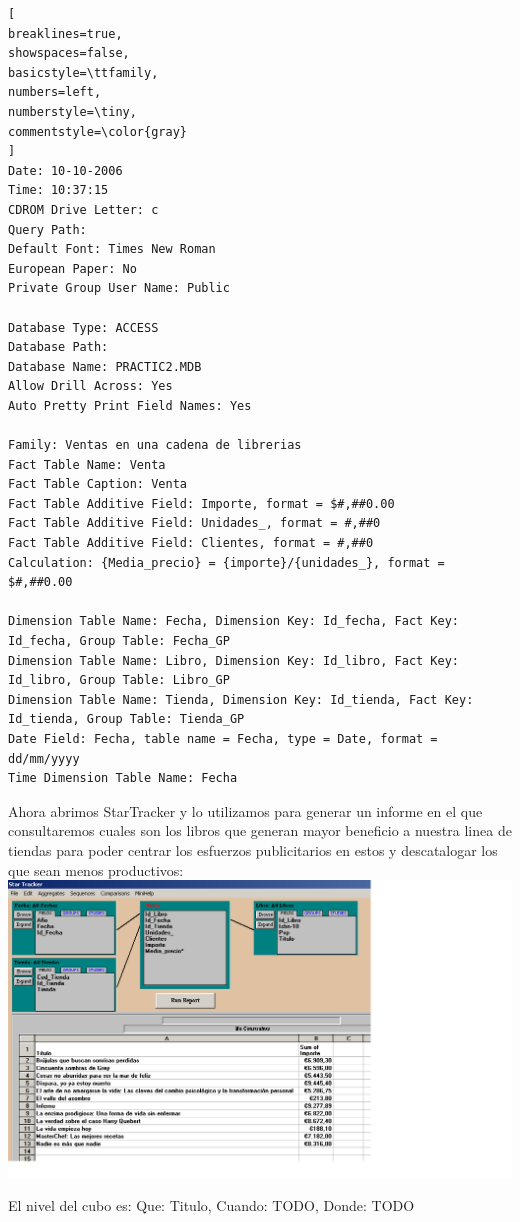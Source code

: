 \documentclass[paper=a4, fontsize=11pt, spanish]{scrartcl}
\numberwithin{equation}{section} %
\numberwithin{figure}{section} %
\numberwithin{table}{section} %
\begin{document}
\begin{lstlisting}[
breaklines=true,
showspaces=false,
basicstyle=\ttfamily,
numbers=left,
numberstyle=\tiny,
commentstyle=\color{gray}
]
Date: 10-10-2006
Time: 10:37:15
CDROM Drive Letter: c
Query Path:
Default Font: Times New Roman
European Paper: No
Private Group User Name: Public

Database Type: ACCESS
Database Path: 
Database Name: PRACTIC2.MDB
Allow Drill Across: Yes
Auto Pretty Print Field Names: Yes

Family: Ventas en una cadena de librerias
Fact Table Name: Venta
Fact Table Caption: Venta
Fact Table Additive Field: Importe, format = $#,##0.00
Fact Table Additive Field: Unidades_, format = #,##0
Fact Table Additive Field: Clientes, format = #,##0
Calculation: {Media_precio} = {importe}/{unidades_}, format = $#,##0.00

Dimension Table Name: Fecha, Dimension Key: Id_fecha, Fact Key: Id_fecha, Group Table: Fecha_GP
Dimension Table Name: Libro, Dimension Key: Id_libro, Fact Key: Id_libro, Group Table: Libro_GP
Dimension Table Name: Tienda, Dimension Key: Id_tienda, Fact Key: Id_tienda, Group Table: Tienda_GP
Date Field: Fecha, table name = Fecha, type = Date, format = dd/mm/yyyy
Time Dimension Table Name: Fecha

\end{lstlisting}

Ahora abrimos StarTracker y lo utilizamos para generar un informe en el que consultaremos cuales son los libros que generan mayor beneficio a nuestra linea de tiendas para poder centrar los esfuerzos publicitarios en estos y descatalogar los que sean menos productivos:
\\

\includegraphics[scale=0.43]{informe1.png}

El nivel del cubo es: Que: Titulo, Cuando: TODO, Donde: TODO
\end{document}
